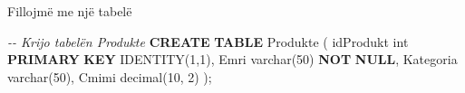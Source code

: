 \documentclass[
  ignorenonframetext,
]{beamer}
\newenvironment{Shaded}{\begin{snugshade}}{\end{snugshade}}
\newcommand{\CommentTok}[1]{\textcolor[rgb]{0.56,0.35,0.01}{\textit{#1}}}
\newcommand{\DataTypeTok}[1]{\textcolor[rgb]{0.13,0.29,0.53}{#1}}
\newcommand{\DecValTok}[1]{\textcolor[rgb]{0.00,0.00,0.81}{#1}}
\newcommand{\KeywordTok}[1]{\textcolor[rgb]{0.13,0.29,0.53}{\textbf{#1}}}
\newcommand{\NormalTok}[1]{#1}
\begin{document}
\begin{frame}[fragile]{Fillojmë me një tabelë}
\label{fillojmuxeb-me-njuxeb-tabeluxeb-2}

\begin{Shaded}
\begin{Highlighting}[]
\CommentTok{{-}{-} Krijo tabelën Produkte}
\KeywordTok{CREATE} \KeywordTok{TABLE}\NormalTok{ Produkte (}
\NormalTok{  idProdukt }\DataTypeTok{int} \KeywordTok{PRIMARY} \KeywordTok{KEY}\NormalTok{ IDENTITY(}\DecValTok{1}\NormalTok{,}\DecValTok{1}\NormalTok{),}
\NormalTok{  Emri }\DataTypeTok{varchar}\NormalTok{(}\DecValTok{50}\NormalTok{) }\KeywordTok{NOT} \KeywordTok{NULL}\NormalTok{,}
\NormalTok{  Kategoria }\DataTypeTok{varchar}\NormalTok{(}\DecValTok{50}\NormalTok{),}
\NormalTok{  Cmimi }\DataTypeTok{decimal}\NormalTok{(}\DecValTok{10}\NormalTok{, }\DecValTok{2}\NormalTok{)}
\NormalTok{);}
\end{Highlighting}
\end{Shaded}
\end{frame}
\end{document}
